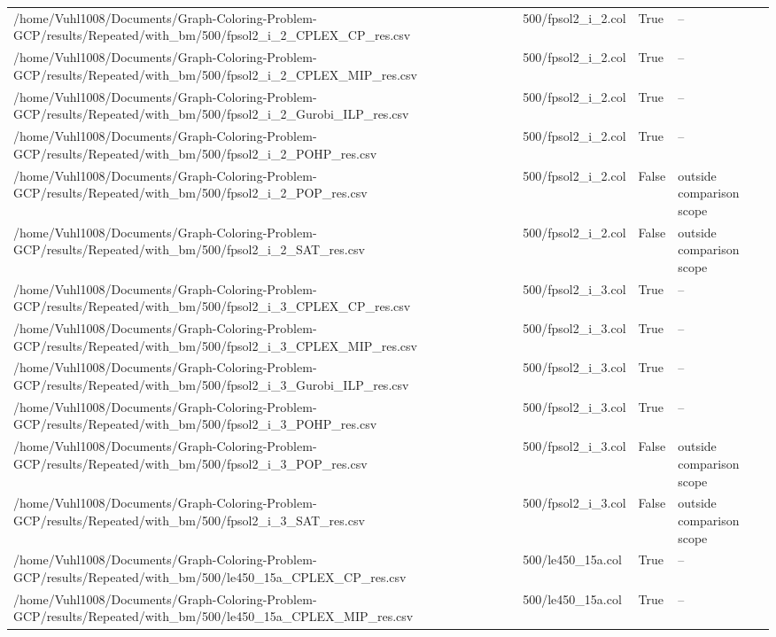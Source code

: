 \begin{table}[htbp]
\begin{tabular}{llll}
/home/Vuhl1008/Documents/Graph-Coloring-Problem-GCP/results/Repeated/with\_bm/500/fpsol2\_i\_2\_CPLEX\_CP\_res.csv & 500/fpsol2\_i\_2.col & True & -- \\
/home/Vuhl1008/Documents/Graph-Coloring-Problem-GCP/results/Repeated/with\_bm/500/fpsol2\_i\_2\_CPLEX\_MIP\_res.csv & 500/fpsol2\_i\_2.col & True & -- \\
/home/Vuhl1008/Documents/Graph-Coloring-Problem-GCP/results/Repeated/with\_bm/500/fpsol2\_i\_2\_Gurobi\_ILP\_res.csv & 500/fpsol2\_i\_2.col & True & -- \\
/home/Vuhl1008/Documents/Graph-Coloring-Problem-GCP/results/Repeated/with\_bm/500/fpsol2\_i\_2\_POHP\_res.csv & 500/fpsol2\_i\_2.col & True & -- \\
/home/Vuhl1008/Documents/Graph-Coloring-Problem-GCP/results/Repeated/with\_bm/500/fpsol2\_i\_2\_POP\_res.csv & 500/fpsol2\_i\_2.col & False & outside comparison scope \\
/home/Vuhl1008/Documents/Graph-Coloring-Problem-GCP/results/Repeated/with\_bm/500/fpsol2\_i\_2\_SAT\_res.csv & 500/fpsol2\_i\_2.col & False & outside comparison scope \\
/home/Vuhl1008/Documents/Graph-Coloring-Problem-GCP/results/Repeated/with\_bm/500/fpsol2\_i\_3\_CPLEX\_CP\_res.csv & 500/fpsol2\_i\_3.col & True & -- \\
/home/Vuhl1008/Documents/Graph-Coloring-Problem-GCP/results/Repeated/with\_bm/500/fpsol2\_i\_3\_CPLEX\_MIP\_res.csv & 500/fpsol2\_i\_3.col & True & -- \\
/home/Vuhl1008/Documents/Graph-Coloring-Problem-GCP/results/Repeated/with\_bm/500/fpsol2\_i\_3\_Gurobi\_ILP\_res.csv & 500/fpsol2\_i\_3.col & True & -- \\
/home/Vuhl1008/Documents/Graph-Coloring-Problem-GCP/results/Repeated/with\_bm/500/fpsol2\_i\_3\_POHP\_res.csv & 500/fpsol2\_i\_3.col & True & -- \\
/home/Vuhl1008/Documents/Graph-Coloring-Problem-GCP/results/Repeated/with\_bm/500/fpsol2\_i\_3\_POP\_res.csv & 500/fpsol2\_i\_3.col & False & outside comparison scope \\
/home/Vuhl1008/Documents/Graph-Coloring-Problem-GCP/results/Repeated/with\_bm/500/fpsol2\_i\_3\_SAT\_res.csv & 500/fpsol2\_i\_3.col & False & outside comparison scope \\
/home/Vuhl1008/Documents/Graph-Coloring-Problem-GCP/results/Repeated/with\_bm/500/le450\_15a\_CPLEX\_CP\_res.csv & 500/le450\_15a.col & True & -- \\
/home/Vuhl1008/Documents/Graph-Coloring-Problem-GCP/results/Repeated/with\_bm/500/le450\_15a\_CPLEX\_MIP\_res.csv & 500/le450\_15a.col & True & -- \\

\end{tabular}
\end{table}
